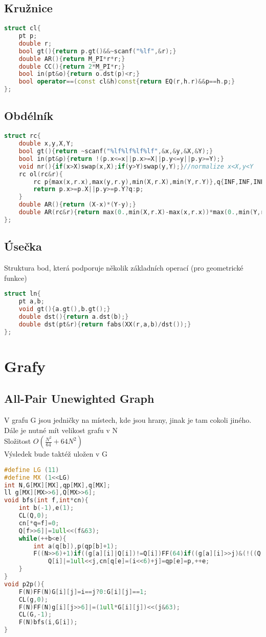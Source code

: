 \documentclass[11pt]{article}
\begin{document}
\subsection{Kružnice}
\begin{lstlisting}[language=C++]
struct cl{
    pt p;
    double r;
    bool gt(){return p.gt()&&~scanf("%lf",&r);}
    double AR(){return M_PI*r*r;}
    double CC(){return 2*M_PI*r;}
    bool in(pt&o){return o.dst(p)<r;}
    bool operator==(const cl&h)const{return EQ(r,h.r)&&p==h.p;}
};
\end{lstlisting}
\subsection{Obdélník}
\begin{lstlisting}[language=C++]
struct rc{
    double x,y,X,Y;
    bool gt(){return ~scanf("%lf%lf%lf%lf",&x,&y,&X,&Y);}
    bool in(pt&p){return !(p.x<=x||p.x>=X||p.y<=y||p.y>=Y);}
    void nr(){if(x>X)swap(x,X);if(y>Y)swap(y,Y);}//normalize x<X,y<Y
    rc ol(rc&r){
        rc p{max(x,r.x),max(y,r.y),min(X,r.X),min(Y,r.Y)},q{INF,INF,INF,INF};
        return p.x>=p.X||p.y>=p.Y?q:p;
    }
    double AR(){return (X-x)*(Y-y);}
    double AR(rc&r){return max(0.,min(X,r.X)-max(x,r.x))*max(0.,min(Y,r.Y)-max(y,r.y));}
};
\end{lstlisting}
\subsection{Úsečka}
Struktura bod, která podporuje několik základních operací (pro geometrické funkce)
\begin{lstlisting}[language=C++]
struct ln{
    pt a,b;
    void gt(){a.gt(),b.gt();}
    double dst(){return a.dst(b);}
    double dst(pt&r){return fabs(XX(r,a,b)/dst());}
};
\end{lstlisting}
\newpage\section{Grafy}
\subsection{All-Pair Unewighted Graph}
V grafu \textsf{G} jsou jedničky na místech, kde jsou hrany, jinak je tam cokoli jiného.
\\Dále je nutné mít velikost grafu v \textsf{N}
\\Složitost $O(\frac{N^2}{64}+64N^2)$
\\Výsledek bude taktéž uložen v \textsf{G}
\begin{lstlisting}[language=C++]
#define LG (11)
#define MX (1<<LG)
int N,G[MX][MX],qp[MX],q[MX];
ll g[MX][MX>>6],Q[MX>>6];
void bfs(int f,int*cn){
    int b(-1),e(1);
    CL(Q,0);
    cn[*q=f]=0;
    Q[f>>6]|=1ull<<(f&63);
    while(++b<e){
        int a(q[b]),p(qp[b]+1);
        F((N>>6)+1)if((g[a][i]|Q[i])!=Q[i])FF(64)if((g[a][i]>>j)&(!((Q[i]>>j)&1)))
            Q[i]|=1ull<<j,cn[q[e]=(i<<6)+j]=qp[e]=p,++e;
    }
}
void p2p(){
    F(N)FF(N)G[i][j]=i==j?0:G[i][j]==1;
    CL(g,0);
    F(N)FF(N)g[i][j>>6]|=(1ull*G[i][j])<<(j&63);
    CL(G,-1);
    F(N)bfs(i,G[i]);
}
\end{lstlisting}
\end{document}
